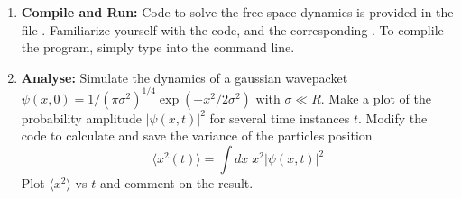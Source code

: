 \documentclass[11pt]{article}
\begin{document}
\begin{enumerate}
\item   \textbf{Compile and Run:} Code to solve the free space dynamics is provided in the file  . Familiarize yourself with the code, and the corresponding .  To complile the program,  simply type  into the command line. 

\item \textbf{Analyse:} Simulate the dynamics of a gaussian wavepacket $\psi(x,0) = 1/(\pi \sigma^2)^{1/4} \exp(-x^2/2\sigma^2)$ with $\sigma \ll  R $. Make a plot of the probability amplitude $|\psi(x,t)|^2$ for several time instances $t$. Modify the code to calculate and save the variance of the particles position 
\begin{equation}
\langle x^2(t) \rangle = \int dx\;   x^2  |\psi(x,t)|^2
\end{equation} 
Plot $\langle x^2 \rangle$ vs $t$  and comment on the result. 
\end{enumerate}
\end{document}
